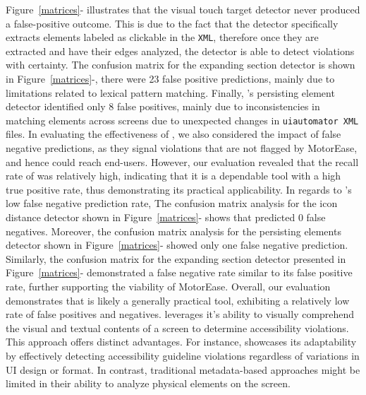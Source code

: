 Figure~\ref{matrices}- illustrates that the visual touch target detector never produced a false-positive outcome. This is due to the fact that the detector specifically extracts elements labeled as clickable in the \texttt{\small XML}, therefore once they are extracted and have their edges analyzed, the detector is able to detect violations with certainty. The confusion matrix for the expanding section detector is shown in Figure~\ref{matrices}-, there were 23 false positive predictions, mainly due to limitations related to lexical pattern matching. Finally, \MotorEase's persisting element detector identified only 8 false positives, mainly due to inconsistencies in matching elements across screens due to unexpected changes in \texttt{\small uiautomator XML} files. In evaluating the effectiveness of \MotorEase, we also considered the impact of false negative predictions, as they signal violations that are not flagged by MotorEase, and hence could reach end-users. However, our evaluation revealed that the recall rate of \MotorEase was relatively high, indicating that it is a dependable tool with a high true positive rate, thus demonstrating its practical applicability.
In regards to \MotorEase's low false negative prediction rate, The confusion matrix analysis for the icon distance detector shown in Figure~\ref{matrices}- shows that \MotorEase predicted 0 false negatives. Moreover, the confusion matrix analysis for the persisting elements detector shown in Figure~\ref{matrices}- showed only one false negative prediction. Similarly, the confusion matrix for the expanding section detector presented in Figure~\ref{matrices}- demonstrated a false negative rate similar to its false positive rate, further supporting the viability of MotorEase. Overall, our evaluation demonstrates that \MotorEase is likely a generally practical tool, exhibiting a relatively low rate of false positives and negatives. %
\MotorEase leverages it's ability to visually comprehend the visual and textual contents of a screen to determine accessibility violations. This approach offers distinct advantages. For instance, \MotorEase showcases its adaptability by effectively detecting accessibility guideline violations regardless of variations in UI design or format. In contrast, traditional metadata-based approaches might be limited in their ability to analyze physical elements on the screen. %






